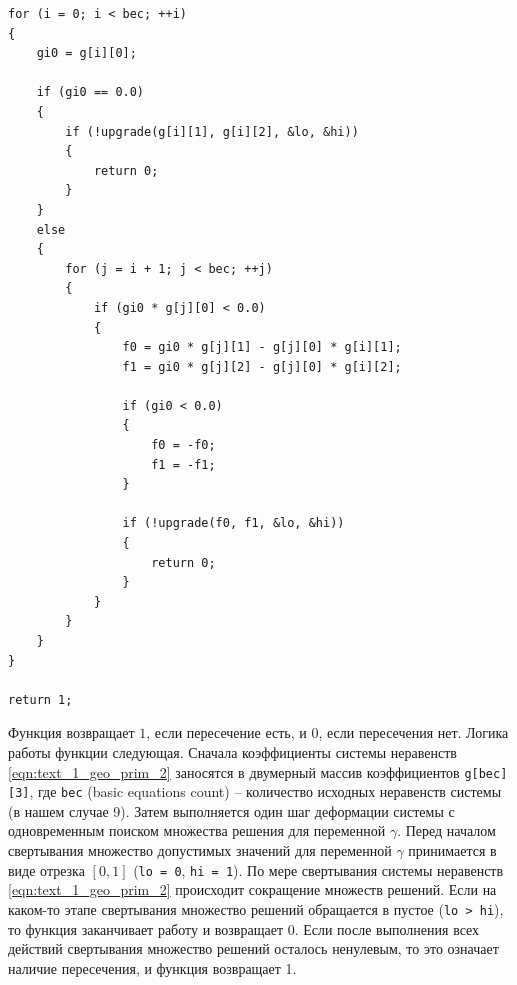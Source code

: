 \begin{singlespace}
\begin{lstlisting}[caption={Исходная реализация свертывания системы линейных неравенств для определения пересечения треугольника и прямоугольного параллелепипеда.},label={lst:text_1_mesh_intersect_tri}]
for (i = 0; i < bec; ++i)
{
    gi0 = g[i][0];

    if (gi0 == 0.0)
    {
        if (!upgrade(g[i][1], g[i][2], &lo, &hi))
        {
            return 0;
        }
    }
    else
    {
        for (j = i + 1; j < bec; ++j)
        {
            if (gi0 * g[j][0] < 0.0)
            {
                f0 = gi0 * g[j][1] - g[j][0] * g[i][1];
                f1 = gi0 * g[j][2] - g[j][0] * g[i][2];

                if (gi0 < 0.0)
                {
                    f0 = -f0;
                    f1 = -f1;
                }

                if (!upgrade(f0, f1, &lo, &hi))
                {
                    return 0;
                }
            }
        }
    }
}

return 1;
\end{lstlisting}
\end{singlespace}

Функция возвращает $1$, если пересечение есть, и $0$, если пересечения нет.
Логика работы функции следующая.
Сначала коэффициенты системы неравенств \eqref{eqn:text_1_geo_prim_2} заносятся в двумерный массив коэффициентов \texttt{g[bec][3]}, где \texttt{bec} (basic equations count) -- количество исходных неравенств системы (в нашем случае 9).
Затем выполняется один шаг деформации системы\label{term:deform_sys_lin_neravenstv2} с одновременным поиском множества решения для переменной $\gamma$.
Перед началом свертывания множество допустимых значений для переменной $\gamma$ принимается в виде отрезка $[0, 1]$ (\texttt{lo = 0}, \texttt{hi = 1}).
По мере свертывания системы неравенств \eqref{eqn:text_1_geo_prim_2} происходит сокращение множеств решений.
Если на каком-то этапе свертывания множество решений обращается в пустое (\texttt{lo > hi}), то функция заканчивает работу и возвращает 0.
Если после выполнения всех действий свертывания множество решений осталось ненулевым, то это означает наличие пересечения, и функция возвращает 1.

